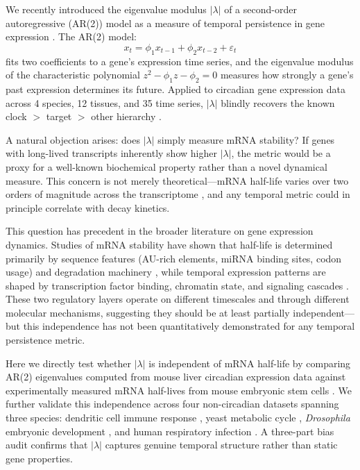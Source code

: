 \documentclass[11pt,letterpaper]{article}
\begin{document}
We recently introduced the eigenvalue modulus $|\lambda|$ of a second-order autoregressive (AR(2)) model as a measure of temporal persistence in gene expression \citep{whiteside2026ar2}. The AR(2) model:
\begin{equation}
x_t = \phi_1 x_{t-1} + \phi_2 x_{t-2} + \varepsilon_t
\end{equation}
fits two coefficients to a gene's expression time series, and the eigenvalue modulus of the characteristic polynomial $z^2 - \phi_1 z - \phi_2 = 0$ measures how strongly a gene's past expression determines its future. Applied to circadian gene expression data across 4 species, 12 tissues, and 35 time series, $|\lambda|$ blindly recovers the known clock $>$ target $>$ other hierarchy \citep{whiteside2026ar2}.

A natural objection arises: does $|\lambda|$ simply measure mRNA stability? If genes with long-lived transcripts inherently show higher $|\lambda|$, the metric would be a proxy for a well-known biochemical property rather than a novel dynamical measure. This concern is not merely theoretical---mRNA half-life varies over two orders of magnitude across the transcriptome \citep{sharova2009database, schwanhausser2011global}, and any temporal metric could in principle correlate with decay kinetics.

This question has precedent in the broader literature on gene expression dynamics. Studies of mRNA stability have shown that half-life is determined primarily by sequence features (AU-rich elements, miRNA binding sites, codon usage) and degradation machinery \citep{chen2008au, bartel2009micrornas, presnyak2015codon}, while temporal expression patterns are shaped by transcription factor binding, chromatin state, and signaling cascades \citep{lee2002transcriptional, kouzarides2007chromatin, alon2007network}. These two regulatory layers operate on different timescales and through different molecular mechanisms, suggesting they should be at least partially independent---but this independence has not been quantitatively demonstrated for any temporal persistence metric.

Here we directly test whether $|\lambda|$ is independent of mRNA half-life by comparing AR(2) eigenvalues computed from mouse liver circadian expression data against experimentally measured mRNA half-lives from mouse embryonic stem cells \citep{sharova2009database}. We further validate this independence across four non-circadian datasets spanning three species: dendritic cell immune response \citep{amit2009unbiased}, yeast metabolic cycle \citep{tu2005logic}, \textit{Drosophila} embryonic development \citep{arbeitman2002gene}, and human respiratory infection \citep{zaas2009gene}. A three-part bias audit confirms that $|\lambda|$ captures genuine temporal structure rather than static gene properties.
\end{document}
